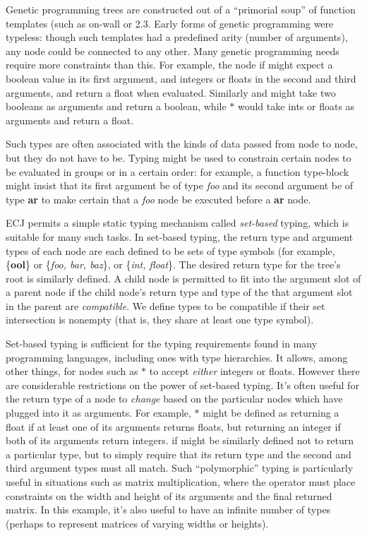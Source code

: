 \documentclass[twoside,10pt]{book}
\newcommand\lisp[1]{\textsf{#1}}
\begin{document}
Genetic programming trees are constructed out of a ``primorial soup'' of function templates (such as \lisp{on-wall} or \lisp{2.3}.  Early forms of genetic programming were typeless: though such templates had a predefined arity (number of arguments), any node could be connected to any other.  Many genetic programming needs require more constraints than this.  For example, the node \lisp{if} might expect a boolean value in its first argument, and integers or floats in the second and third arguments, and return a float when evaluated.  Similarly \lisp{and} might take two booleans as arguments and return a boolean, while \lisp{\(\ast\)} would take ints or floats as arguments and return a float.

Such types are often associated with the kinds of data passed from node to node, but they do not have to be.  Typing might be used to constrain certain nodes to be evaluated in groups or in a certain order: for example, a function \lisp{type-block} might insist that its first argument be of type \textit{foo} and its second argument be of type \textbf{ar} to make certain that a \textit{foo} node be executed before a \textbf{ar} node.

ECJ permits a simple static typing mechanism called {\it set-based} typing, which is suitable for many such tasks.  In set-based typing, the return type and argument types of each node are each defined to be  sets of type symbols (for example, \{\textbf{ool}\} or \{\textit{foo, bar, baz}\}, or \{\textit{int, float}\}.  The desired return type for the tree's root is similarly defined.  A child node is permitted to fit into the argument slot of a parent node if the child node's return type and type of the that argument slot in the parent are {\it compatible}.  We define types to be compatible if their set intersection is nonempty (that is, they share at least one type symbol).

Set-based typing is sufficient for the typing requirements found in many programming languages, including ones with type hierarchies.  It allows, among other things, for nodes such as \lisp{\(\ast\)} to accept {\it either} integers or floats.  However there are considerable restrictions on the power of set-based typing.  It's often useful for the return type of a node to {\it change} based on the particular nodes which have plugged into it as arguments. For example, \lisp{\(\ast\)} might be defined as returning a float if at least one of its arguments returns floats, but returning an integer if both of its arguments return integers.  \lisp{if} might be similarly defined not to return a particular type, but to simply require that its return type and the second and third argument types must all match.  Such ``polymorphic'' typing is particularly useful in situations such as matrix multiplication, where the operator must place constraints on the width and height of its arguments and the final returned matrix.  In this example, it's also useful to have an infinite number of types (perhaps to represent matrices of varying widths or heights).
\end{document}
